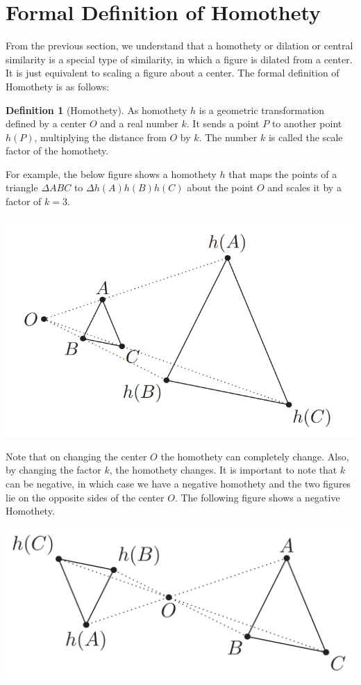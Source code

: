 \documentclass[12pt]{article}
\theoremstyle{definition}
\newtheorem{definition}{Definition}
\begin{document}
\section{Formal Definition of Homothety}
From the previous section, we understand that a homothety or dilation or central similarity is a special type of similarity,
in which a figure is dilated from a center. It is just equivalent to scaling a figure about a center. The formal definition of Homothety is as follows:
\begin{definition}[Homothety]
As homothety $h$ is a geometric transformation defined by a center $O$ and a real number $k$. It sends a point $P$ to another point $h(P)$, multiplying the distance from $O$ by $k$.
The number $k$ is called the scale factor of the homothety.
\end{definition}
 For example, the below figure shows a homothety $h$ that maps the points of a triangle $\Delta ABC$ to $\Delta h(A)h(B)h(C)$ about the point $O$ and scales it by a factor of $k=3$.
 \begin{center}
     \includegraphics[scale=0.7]{images/zpcpic2.png}
 \end{center}
Note that on changing the center $O$ the homothety can completely change. Also, by changing the factor $k$, the homothety changes. It is important to note that $k$ can be negative, in which case we have a negative homothety and the two figures lie on the opposite sides of the center $O$. The following figure shows a negative Homothety.

\begin{center}
    \includegraphics[scale=0.5]{images/zpcpic3.png}
\end{center}
\end{document}
